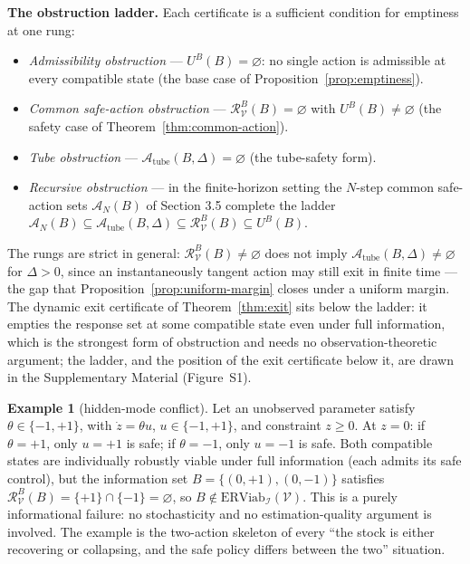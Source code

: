 \documentclass[10pt,twocolumn]{article}
\theoremstyle{definition}
\newtheorem{example}{Example}
\begin{document}
\textbf{The obstruction ladder.} Each certificate is a sufficient
condition for emptiness at one rung:
\begin{itemize}
\item \emph{Admissibility obstruction} --- \(U^B(B)=\varnothing\): no
single action is admissible at every compatible state (the base case of
Proposition~\ref{prop:emptiness}).
\item \emph{Common safe-action obstruction} ---
\(\mathcal{R}_{\mathcal{V}}^B(B)=\varnothing\) with
\(U^B(B)\neq\varnothing\) (the safety case of
Theorem~\ref{thm:common-action}).
\item \emph{Tube obstruction} ---
\(\mathcal{A}_{\mathrm{tube}}(B,\Delta)=\varnothing\) (the tube-safety
form).
\item \emph{Recursive obstruction} --- in the finite-horizon setting the
\(N\)-step common safe-action sets \(\mathcal{A}_N(B)\) of Section 3.5 complete the ladder
\(\mathcal{A}_N(B)\subseteq\mathcal{A}_{\mathrm{tube}}(B,\Delta)\subseteq\mathcal{R}_{\mathcal{V}}^B(B)\subseteq U^B(B)\).
\end{itemize}
The rungs are strict in general: \(\mathcal{R}_{\mathcal{V}}^B(B)\neq\varnothing\)
does not imply \(\mathcal{A}_{\mathrm{tube}}(B,\Delta)\neq\varnothing\)
for \(\Delta>0\), since an instantaneously tangent action may still exit
in finite time --- the gap that Proposition~\ref{prop:uniform-margin}
closes under a uniform margin. The dynamic exit certificate of
Theorem~\ref{thm:exit} sits below the ladder: it empties the response
set at some compatible state even under full information, which is the
strongest form of obstruction and needs no observation-theoretic
argument; the ladder, and the position of the exit certificate below it, are drawn in the Supplementary Material (Figure~S1).



\begin{example}[hidden-mode conflict]\label{ex:hidden-mode} Let an unobserved parameter satisfy
\(\theta \in \{-1, +1\}\), with \(\dot z = \theta u\),
\(u \in \{-1, +1\}\), and constraint \(z \ge 0\). At \(z = 0\): if
\(\theta = +1\), only \(u = +1\) is safe; if \(\theta = -1\), only
\(u = -1\) is safe. Both compatible states are individually robustly
viable under full information (each admits its safe control), but the
information set \(B = \{(0, +1), (0, -1)\}\) satisfies
\(\mathcal{R}_{\mathcal{V}}^B(B) = \{+1\} \cap \{-1\} = \varnothing\),
so \(B \notin \mathrm{ERViab}_{\mathcal{I}}(\mathcal{V})\). This is a
purely informational failure: no stochasticity and no estimation-quality
argument is involved. The example is the two-action skeleton of every
``the stock is either recovering or collapsing, and the safe policy
differs between the two'' situation.

\end{example}
\end{document}
